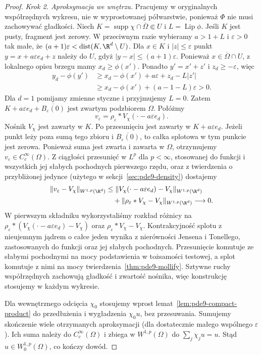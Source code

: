 \begin{proof}
\emph{Krok 2. Aproksymacja we wnętrzu.}
Pracujemy w oryginalnych współrzędnych wykresu, nie
w wyprostowanej półwarstwie, ponieważ $\Phi$ nie musi
zachowywać gładkości. Niech
$K=\operatorname{supp}\chi\cap\overline\Omega\Subset U$
i $L=\operatorname{Lip}\phi$. Jeśli $K$ jest pusty,
fragment jest zerowy. W przeciwnym razie wybieramy
$a>1+L$ i $\varepsilon>0$ tak małe, że
$(a+1)\varepsilon<\operatorname{dist}(K,\R^d\setminus U)$.
Dla $x\in K$ i $|z|\le\varepsilon$ punkt
$y=x+a\varepsilon e_d+z$ należy do $U$, gdyż
$|y-x|\le(a+1)\varepsilon$.
Ponieważ $x\in\overline\Omega\cap U$, z lokalnego
opisu brzegu mamy $x_d\ge\phi(x')$.
Ponadto $y'=x'+z'$ i $z_d\ge-\varepsilon$, więc
\[
 \begin{aligned}
 y_d-\phi(y')
 &\ge x_d-\phi(x')+a\varepsilon+z_d-L|z'|\\
 &\ge x_d-\phi(x')+(a-1-L)\varepsilon>0.
 \end{aligned}
\]
Dla $d=1$ pomijamy zmienne styczne i przyjmujemy $L=0$.
Zatem $K+a\varepsilon e_d+\overline{B_\varepsilon(0)}$
jest zwartym podzbiorem $\Omega$.
Połóżmy
\[
 v_\varepsilon=\rho_\varepsilon*
                  V_\chi(\cdot-a\varepsilon e_d).
\]
Nośnik $V_\chi$ jest zawarty w $K$. Po przesunięciu
jest zawarty w $K+a\varepsilon e_d$.
Jeżeli punkt leży poza sumą tego zbioru i
$\overline{B_\varepsilon(0)}$, to całka splotowa
w tym punkcie jest zerowa. Ponieważ suma jest zwarta
i zawarta w $\Omega$, otrzymujemy
$v_\varepsilon\in C_c^\infty(\Omega)$.
Z ciągłości przesunięć w $L^p$ dla $p<\infty$,
stosowanej do funkcji i wszystkich jej słabych pochodnych
pierwszego rzędu, oraz z twierdzenia o przybliżonej jedynce
(użytego w sekcji~\ref{sec:pde9-density}) dostajemy
\[
 \begin{aligned}
 \|v_\varepsilon-V_\chi\|_{W^{1,p}(\R^d)}
 &\le\|V_\chi(\cdot-a\varepsilon e_d)-V_\chi\|_{W^{1,p}(\R^d)}\\
 &\quad+\|\rho_\varepsilon*V_\chi-V_\chi\|_{W^{1,p}(\R^d)}
 \longrightarrow0 .
 \end{aligned}
\]
W pierwszym składniku wykorzystaliśmy rozkład różnicy
na $\rho_\varepsilon*(V_\chi(\cdot-a\varepsilon e_d)-V_\chi)$
oraz $\rho_\varepsilon*V_\chi-V_\chi$.
Kontrakcyjność splotu z nieujemnym jądrem o całce jeden
wynika z nierówności Jensena i Tonellego, zastosowanych
do funkcji oraz jej słabych pochodnych. Przesunięcie
komutuje ze słabymi pochodnymi na mocy podstawienia
w tożsamości testowej, a splot komutuje z nimi na mocy
twierdzenia~\ref{thm:pde9-mollify}.
Sztywne ruchy współrzędnych zachowują gładkość i zwartość
nośnika, więc konstrukcję stosujemy w każdym wykresie.

Dla wewnętrznego odcięcia $\chi_0$ stosujemy wprost
lemat~\ref{lem:pde9-compact-product} do przedłużenia
i wygładzenia $\chi_0u$, bez przesuwania.
Sumujemy skończenie wiele otrzymanych aproksymacji
(dla dostatecznie małego wspólnego $\varepsilon$).
Ich suma należy do $C_c^\infty(\Omega)$ i zbiega
w $W^{1,p}(\Omega)$ do $\sum_j\chi_j u=u$.
Stąd $u\in W_0^{1,p}(\Omega)$, co kończy dowód.
\end{proof}

